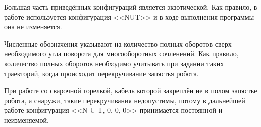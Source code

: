 Большая часть приведённых конфигураций является экзотической.
Как правило, в работе используется конфигурация <<NUT>> и в ходе выполнения программы она не изменяется.

Численные обозначения указывают на количество полных оборотов сверх необходимого угла поворота для многооборотных сочленений.
Как правило, количество полных оборотов необходимо учитывать при задании таких траекторий, когда происходит перекручивание запястья робота.

При работе со сварочной горелкой, кабель которой закреплён не в полом запястье робота, а снаружи, такие перекручивания недопустимы, потому в дальнейшей работе конфигурация <<N U T, 0, 0, 0>> принимается постоянной и неизменяемой.
